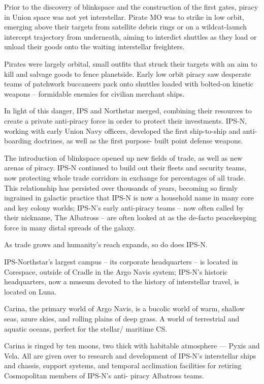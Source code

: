 Prior to the discovery of blinkspace and the construction of the first gates, piracy in Union space
was not yet interstellar. Pirate MO was to strike in low orbit, emerging above their targets from
satellite debris rings or on a wildcat-launch intercept trajectory from underneath, aiming to interdict
shuttles as they load or unload their goods onto the waiting interstellar freighters.

Pirates were largely orbital, small outfits that struck their targets with an aim to kill and salvage
goods to fence planetside. Early low orbit piracy saw desperate teams of patchwork buccaneers
pack onto shuttles loaded with bolted-on kinetic weapons -- formidable enemies for civilian
merchant ships.

In light of this danger, IPS and Northstar merged, combining their resources to create a private
anti-piracy force in order to protect their investments. IPS-N, working with early Union Navy
officers, developed the first ship-to-ship and anti-boarding doctrines, as well as the first purpose-
built point defense weapons.

The introduction of blinkspace opened up new fields of trade, as well as new arenas of piracy.
IPS-N continued to build out their fleets and security teams, now protecting whole trade corridors
in exchange for percentages of all trade. This relationship has persisted over thousands of years,
becoming so firmly ingrained in galactic practice that IPS-N is now a household name in many
core and key colony worlds; IPS-N's early anti-piracy teams -- now often called by their nickname,
The Albatross -- are often looked at as the de-facto peacekeeping force in many distal spreads of
the galaxy.

As trade grows and humanity's reach expands, so do does IPS-N.

IPS-Northstar's largest campus -- its corporate headquarters -- is located in Corespace, outside
of Cradle in the Argo Navis system; IPS-N's historic headquarters, now a museum devoted to the
history of interstellar travel, is located on Luna.

Carina, the primary world of Argo Navis, is a bucolic world of warm, shallow seas, azure skies,
and rolling plains of deep grass. A world of terrestrial and aquatic oceans, perfect for the stellar/
maritime CS.

Carina is ringed by ten moons, two thick with habitable atmosphere — Pyxis and Vela. All are
given over to research and development of IPS-N's interstellar ships and chassis, support
systems, and temporal acclimation facilities for retiring Cosmopolitan members of IPS-N's anti-
piracy Albatross teams.

